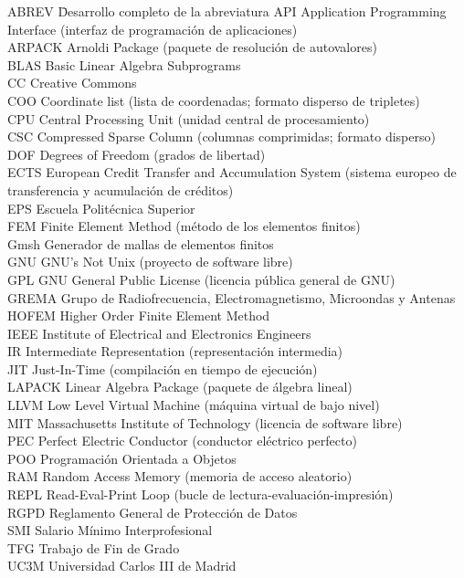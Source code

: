 \documentclass[12pt]{report} %
\begin{document}
\begin{tabbing}
	ABREV \quad\= Desarrollo completo de la abreviatura \kill
	API \> Application Programming Interface (interfaz de programación de aplicaciones) \\
	ARPACK \> Arnoldi Package (paquete de resolución de autovalores) \\
	BLAS \> Basic Linear Algebra Subprograms \\
	CC \> Creative Commons \\
	COO \> Coordinate list (lista de coordenadas; formato disperso de tripletes) \\
	CPU \> Central Processing Unit (unidad central de procesamiento) \\
	CSC \> Compressed Sparse Column (columnas comprimidas; formato disperso) \\
	DOF \> Degrees of Freedom (grados de libertad) \\
	ECTS \> European Credit Transfer and Accumulation System (sistema europeo de transferencia y acumulación de créditos) \\
	EPS \> Escuela Politécnica Superior \\
	FEM \> Finite Element Method (método de los elementos finitos) \\
	Gmsh \> Generador de mallas de elementos finitos \\
	GNU \> GNU's Not Unix (proyecto de software libre) \\
	GPL \> GNU General Public License (licencia pública general de GNU) \\
	GREMA \> Grupo de Radiofrecuencia, Electromagnetismo, Microondas y Antenas \\
	HOFEM \> Higher Order Finite Element Method \\
	IEEE \> Institute of Electrical and Electronics Engineers \\
	IR \> Intermediate Representation (representación intermedia) \\
	JIT \> Just-In-Time (compilación en tiempo de ejecución) \\
	LAPACK \> Linear Algebra Package (paquete de álgebra lineal) \\
	LLVM \> Low Level Virtual Machine (máquina virtual de bajo nivel) \\
	MIT \> Massachusetts Institute of Technology (licencia de software libre) \\
	PEC \> Perfect Electric Conductor (conductor eléctrico perfecto) \\
	POO \> Programación Orientada a Objetos \\
	RAM \> Random Access Memory (memoria de acceso aleatorio) \\
	REPL \> Read-Eval-Print Loop (bucle de lectura-evaluación-impresión) \\
	RGPD \> Reglamento General de Protección de Datos \\
	SMI \> Salario Mínimo Interprofesional \\
	TFG \> Trabajo de Fin de Grado \\
	UC3M \> Universidad Carlos III de Madrid
\end{tabbing}
\end{document}
